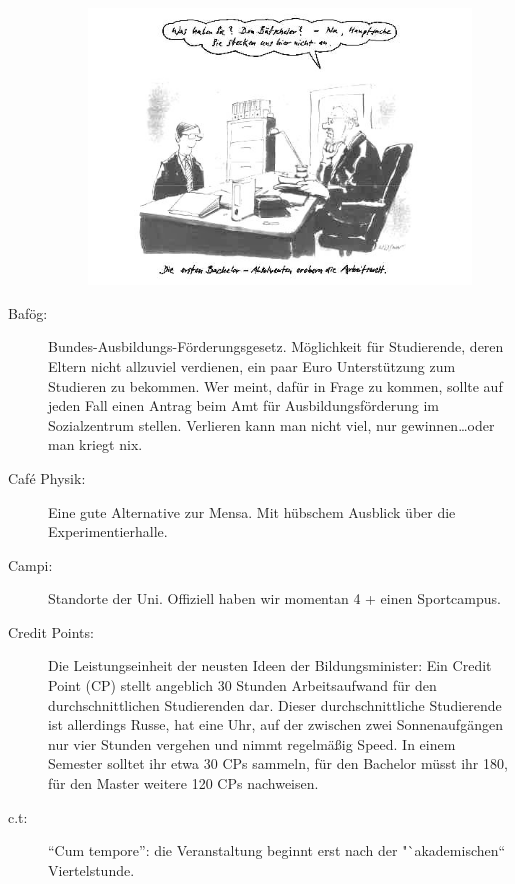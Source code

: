 \begin{description}
\begin{figure}[!h]
\begin{center}
  \includegraphics[width=.8\textwidth]{bilder/bachelor.jpg}
\end{center}
\end{figure}

    \item[Bafög:]Bundes-Ausbildungs-Förderungsgesetz.
      Möglichkeit für Studierende, deren Eltern nicht allzuviel verdienen, ein paar Euro
Unterstützung zum Studieren zu bekommen.
Wer meint, dafür in Frage zu kommen, sollte auf jeden Fall einen Antrag beim Amt für
Ausbildungsförderung im Sozialzentrum stellen.
Verlieren kann man nicht viel, nur gewinnen\ldots oder man kriegt nix.

\item[Café Physik:] Eine gute Alternative zur Mensa.
  Mit hübschem Ausblick über die Experimentierhalle.

\item[Campi:] Standorte der Uni.
  Offiziell haben wir momentan 4 + einen Sportcampus.

   \item[Credit Points:] Die Leistungseinheit der neusten Ideen der Bildungsminister:
     Ein Credit Point (CP) stellt angeblich 30 Stunden Arbeitsaufwand für den durchschnittlichen Studierenden dar.
Dieser durchschnittliche Studierende ist allerdings Russe, hat eine Uhr,
auf der zwischen zwei Sonnenaufgängen nur vier Stunden vergehen und nimmt regelmäßig Speed.
In einem Semester solltet ihr etwa 30 CPs sammeln, für den Bachelor müsst ihr 180, für den
Master weitere 120 CPs nachweisen.

    \item[c.t:] "`Cum tempore"': die Veranstaltung beginnt erst nach der "`akademischen`` Viertelstunde.


\end{description}
